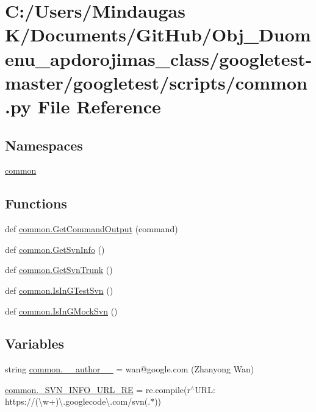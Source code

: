 \hypertarget{googletest-master_2googletest_2scripts_2common_8py}{}\section{C\+:/\+Users/\+Mindaugas K/\+Documents/\+Git\+Hub/\+Obj\+\_\+\+Duomenu\+\_\+apdorojimas\+\_\+class/googletest-\/master/googletest/scripts/common.py File Reference}
\label{googletest-master_2googletest_2scripts_2common_8py}
\subsection*{Namespaces}
\begin{DoxyCompactItemize}
\item 
 \mbox{\hyperlink{namespacecommon}{common}}
\end{DoxyCompactItemize}
\subsection*{Functions}
\begin{DoxyCompactItemize}
\item 
def \mbox{\hyperlink{namespacecommon_ac1337758ae23f6a91b44de07408791da}{common.\+Get\+Command\+Output}} (command)
\item 
def \mbox{\hyperlink{namespacecommon_a312d07161b76d965fee6a61e464e283f}{common.\+Get\+Svn\+Info}} ()
\item 
def \mbox{\hyperlink{namespacecommon_a9e6483972a8dc0a6a274cbcee69564b0}{common.\+Get\+Svn\+Trunk}} ()
\item 
def \mbox{\hyperlink{namespacecommon_af29dcab2d7b4a9dd846446a0987ab387}{common.\+Is\+In\+G\+Test\+Svn}} ()
\item 
def \mbox{\hyperlink{namespacecommon_a8219bb529336fc3f0ef8222a5ed48222}{common.\+Is\+In\+G\+Mock\+Svn}} ()
\end{DoxyCompactItemize}
\subsection*{Variables}
\begin{DoxyCompactItemize}
\item 
string \mbox{\hyperlink{namespacecommon_ac0f2c8f2583f0817f09a3e0c6022d707}{common.\+\_\+\+\_\+author\+\_\+\+\_\+}} = \textquotesingle{}wan@google.\+com (Zhanyong Wan)\textquotesingle{}
\item 
\mbox{\hyperlink{namespacecommon_a8441f667816bce34e6100f88a9ea7dfa}{common.\+\_\+\+S\+V\+N\+\_\+\+I\+N\+F\+O\+\_\+\+U\+R\+L\+\_\+\+RE}} = re.\+compile(r\textquotesingle{}$^\wedge$U\+R\+L\+: https\+://(\textbackslash{}w+)\textbackslash{}.googlecode\textbackslash{}.\+com/svn(.$\ast$)\textquotesingle{})
\end{DoxyCompactItemize}
